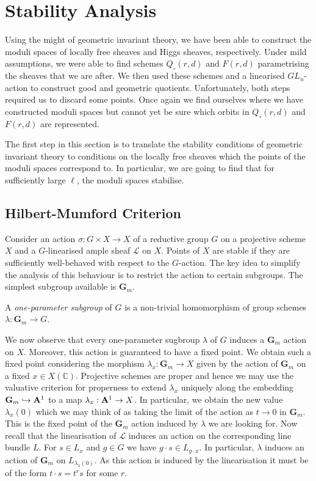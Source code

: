 \documentclass[12pt]{ociamthesis}  %
\begin{document}
\section{Stability Analysis}

Using the might of geometric invariant theory, we have been able
to construct the moduli spaces of locally free sheaves and Higgs
sheaves, respectively. Under mild assumptions, we were able to
find schemes $Q_\circ(r,d)$ and $F(r,d)$ parametrising the sheaves
that we are after. We then used these schemes and a linearised
$GL_n$-action to construct good and geometric quotients.
Unfortunately, both steps required us to discard some points.
Once again we find ourselves where we have constructed moduli spaces
but cannot yet be sure which orbits in $Q_\circ(r,d)$ and $F(r,d)$
are represented.

The first step in this section is to translate the stability
conditions of geometric invariant theory to conditions on the locally
free sheaves which the points of the moduli spaces correspond to.
In particular, we are going to find that for sufficiently large $\ell$,
the moduli spaces stabilise.

\subsection{Hilbert-Mumford Criterion}

Consider an action $\sigma : G \times X\to X$ of a reductive group $G$
on a projective scheme $X$ and a $G$-linearised ample sheaf
$\mathscr L$ on $X$. Points of $X$ are stable if they are sufficiently
well-behaved with respect to the $G$-action. The key idea to simplify
the analysis of this behaviour is to restrict the action to certain
subgroups. The simplest subgroup available is $\mathbf G_m$.

\begin{definition}
  A \emph{one-parameter subgroup} of $G$ is a non-trivial homomorphism
  of group schemes $\lambda : \mathbf G_m \to G$.
\end{definition}

We now observe that every one-parameter sugbroup $\lambda$ of $G$
induces a $\mathbf G_m$ action on $X$. Moreover, this action is
guaranteed to have a fixed point. We obtain such a fixed point
considering the morphism $\lambda_x : \mathbf G_m \to X$ given by
the action of $\mathbf G_m$ on a fixed $x \in X(\mathbb C)$.
Projective schemes are proper and hence we may use the valuative
criterion for properness to extend $\lambda_x$ uniquely along the
embedding $\mathbf G_m \hookrightarrow \mathbf{A}^{1}_{}$ to a map
$\lambda_x : \mathbf{A}^{1}_{} \to X$.
In particular, we obtain
the new value $\lambda_x(0)$ which
we may think of as taking the limit of the action as $t\to 0$
in $\mathbf G_m$. This is the fixed point  of the $\mathbf G_m$
action induced by $\lambda$ we are looking for. Now recall that the
linearisation of $\mathscr L$ induces an action on the corresponding
line bundle $L$. For $s\in L_x$ and $g\in G$ we have
$g\cdot s\in L_{g\cdot x}$. In particular, $\lambda$ induces an
action of $\mathbf G_m$ on $L_{\lambda_x(0)}$. As this action is
induced by the linearisation it must be of the form 
$t\cdot s = t^r s$ for some $r$. 
\end{document}
